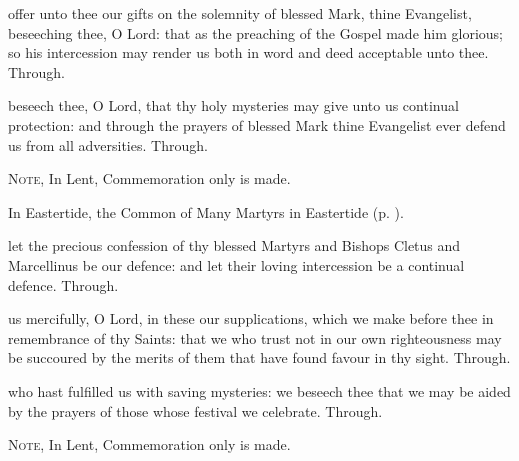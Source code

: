 
\secret
{} offer unto thee our gifts on the solemnity of blessed Mark, thine Evangelist, beseeching thee, O Lord: that as the preaching of the Gospel made him glorious; so his intercession may render us both in word and deed acceptable unto thee. Through.


\postcommunion
{} beseech thee, O Lord, that thy holy mysteries may give unto us continual protection: and through the prayers of blessed Mark thine Evangelist ever defend us from all adversities. Through.



\begin{rubric}
	\textsc{Note,} In Lent, Commemoration only is made.
\end{rubric}

\begin{rubric}
	In Eastertide, the Common of Many Martyrs in Eastertide (p. \pageref{CommonMartyrsEaster}).
\end{rubric}

\collect
{} let the precious confession of thy blessed Martyrs and Bishops Cletus and Marcellinus be our defence: and let their loving intercession be a continual defence. Through.

\secret
{} us mercifully, O Lord, in these our supplications, which we make before thee in remembrance of thy Saints: that we who trust not in our own righteousness may be succoured by the merits of them that have found favour in thy sight. Through.

\postcommunion
{} who hast fulfilled us with saving mysteries: we beseech thee that we may be aided by the prayers of those whose festival we celebrate. Through.



\begin{rubric}
	\textsc{Note,} In Lent, Commemoration only is made.
\end{rubric}

